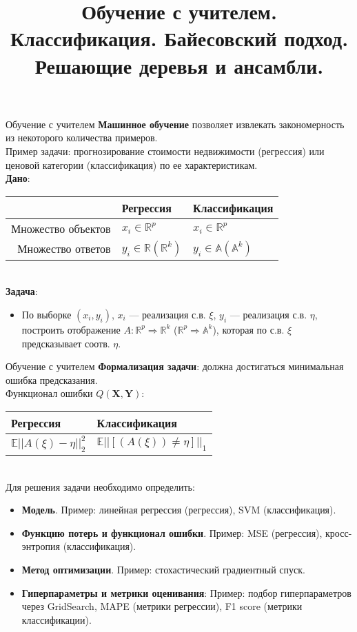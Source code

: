 \documentclass[handout]{beamer}
\title[Статистическое и машинное обучение]{Обучение с учителем. Классификация. Байесовский подход. Решающие деревья и ансамбли.}
\institute[ ]{%
	\small
	Санкт-Петербургский государственный университет\\
	Кафедра статистического моделирования
}
\date{}
\begin{document}
	
	\begin{frame}
		\titlepage
	\end{frame}

\begin{frame}{Обучение с учителем}
    \textbf{Машинное обучение} позволяет извлекать закономерность из некоторого количества примеров.\\
	Пример задачи: прогнозирование стоимости недвижимости (регрессия) или ценовой категории (классификация) по ее характеристикам.\\
	\vspace*{3pt}
	\textbf{Дано}:\\
	\vspace*{3pt}
	\begin{tabular}{|r|l|l|}
	  \hline
	  & Регрессия & Классификация \\
	  \hline
		Множество объектов & $x_i \in \mathbb{R}^p$ & $x_i \in \mathbb{R}^p$ \\
	\hline
		Множество ответов & $y_i \in \mathbb{R}( \mathbb{R}^k)$ & $y_i \in \mathbb{A}(\mathbb{A}^k)$ \\
	   \hline
	\end{tabular}\\
	\vspace*{3pt}
	\textbf{Задача}:
	\begin{itemize}
		\item По выборке $(x_i, y_i)$, $x_i$ --- реализация с.в. $\xi$, $y_i$ --- реализация с.в. $\eta$, построить отображение $A: \mathbb{R}^p \Rightarrow \mathbb{R}^k$ ($\mathbb{R}^p \Rightarrow \mathbb{A}^k$), которая по с.в. $\xi$ предсказывает соотв. $\eta$.
	\end{itemize}
\end{frame}

\begin{frame}{Обучение с учителем}
	\textbf{Формализация задачи}: должна достигаться минимальная ошибка предсказания. \\
	Функционал ошибки $Q(\mathbf{X}, \mathbf{Y})$:\\
	\begin{tabular}{|l|l|}
	  \hline
	  Регрессия & Классификация \\
	  \hline
		 $\mathbb{E}||A(\xi)-\eta||^2_2$ & $\mathbb{E}||[(A(\xi)) \neq \eta]||_1$ \\
	   \hline
	\end{tabular}\\
	Для решения задачи необходимо определить:
	\begin{itemize}
		\item \textbf{Модель}. Пример: линейная регрессия (регрессия), SVM (классификация).
		\item \textbf{Функцию потерь и функционал ошибки}. Пример: MSE (регрессия), кросс-энтропия (классификация). 
		\item \textbf{Метод оптимизации}. Пример: стохастический градиентный спуск.
		\item \textbf{Гиперпараметры и метрики оценивания}: Пример: подбор гиперпараметров через GridSearch, MAPE (метрики регрессии), F1 score (метрики классификации).  
	\end{itemize}
\end{frame}
\end{document}

